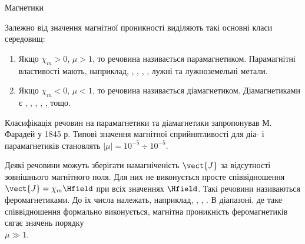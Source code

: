 \documentclass[onlytextwidth]{beamer}
\begin{document}
\begin{frame}{Магнетики}{}
	\begin{block}{}\justifying
		Залежно від значення магнітної проникності виділяють такі основні класи середовищ:
		\begin{enumerate}
			\item Якщо $\chi_m > 0$, $\mu > 1$, то речовина називається \alert{парамагнетиком}. Парамагнітні властивості мають, наприклад,
			      \href{https://en.wikipedia.org/wiki/Aluminium}{},
			      \href{https://en.wikipedia.org/wiki/Platinum}{},
			      \href{https://en.wikipedia.org/wiki/Iron(II)\_chloride}{},
			      \href{https://en.wikipedia.org/wiki/Oxygen}{},
			      лужні та лужноземельні метали.

			\item Якщо $\chi_m < 0$, $\mu < 1$, то речовина називається \alert{діамагнетиком}. Діамагнетиками  є
			      \href{https://en.wikipedia.org/wiki/Bismuth}{},
			      \href{https://en.wikipedia.org/wiki/Antimony}{},
			      \href{https://en.wikipedia.org/wiki/Silicon}{},
			      \href{https://en.wikipedia.org/wiki/Water}{},
			      \href{https://en.wikipedia.org/wiki/Dihydrogen}{},
			      \href{https://en.wikipedia.org/wiki/Nitrogen}{} тощо.
		\end{enumerate}
		Класифікація речовин на парамагнетики та діамагнетики запропонував М. Фарадей у 1845 р. Типові значення магнітної сприйнятливості для діа- і
		парамагнетиків становлять $|\mu| = 10^{-5} \div 10^{-5}$.
	\end{block}
	\vspace*{-1em}
	\begin{block}{}\justifying\small
		Деякі речовини можуть зберігати намагніченість $\vect{J}$ за відсутності зовнішнього магнітного поля. Для них не виконується просте співвідношення
		$\vect{J} = \chi_m\Hfield$ при всіх значеннях $\Hfield$. Такі речовини називаються \alert{феромагнетиками}. До їх числа належать, наприклад, ,
		, . В діапазоні, де таке співвідношення формально виконується, магнітна проникність феромагнетиків сягає значень порядку\\ $\mu
			\gg 1$.
	\end{block}
\end{frame}
\end{document}
